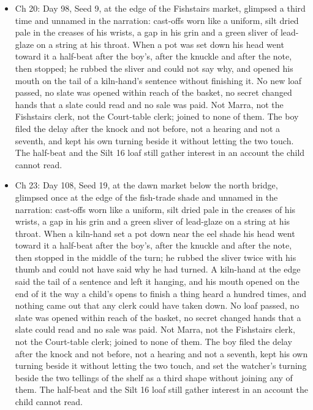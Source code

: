 \documentclass{design/chronicle}
\begin{document}
{\begin{itemize}[leftmargin=1.4em,itemsep=1pt,topsep=3pt,parsep=0pt]
\item Ch 20: Day 98, Seed 9, at the edge of the Fishstairs market, glimpsed a third time and unnamed in the narration: cast-offs worn like a uniform, silt dried pale in the creases of his wrists, a gap in his grin and a green sliver of lead-glaze on a string at his throat. When a pot was set down his head went toward it a half-beat after the boy’s, after the knuckle and after the note, then stopped; he rubbed the sliver and could not say why, and opened his mouth on the tail of a kiln-hand’s sentence without finishing it. No new loaf passed, no slate was opened within reach of the basket, no secret changed hands that a slate could read and no sale was paid. Not Marra, not the Fishstairs clerk, not the Court-table clerk; joined to none of them. The boy filed the delay after the knock and not before, not a hearing and not a seventh, and kept his own turning beside it without letting the two touch. The half-beat and the Silt 16 loaf still gather interest in an account the child cannot read.

\end{itemize}

\begin{itemize}[leftmargin=1.4em,itemsep=1pt,topsep=3pt,parsep=0pt]

\item Ch 23: Day 108, Seed 19, at the dawn market below the north bridge, glimpsed once at the edge of the fish-trade shade and unnamed in the narration: cast-offs worn like a uniform, silt dried pale in the creases of his wrists, a gap in his grin and a green sliver of lead-glaze on a string at his throat. When a kiln-hand set a pot down near the eel shade his head went toward it a half-beat after the boy’s, after the knuckle and after the note, then stopped in the middle of the turn; he rubbed the sliver twice with his thumb and could not have said why he had turned. A kiln-hand at the edge said the tail of a sentence and left it hanging, and his mouth opened on the end of it the way a child’s opens to finish a thing heard a hundred times, and nothing came out that any clerk could have taken down. No loaf passed, no slate was opened within reach of the basket, no secret changed hands that a slate could read and no sale was paid. Not Marra, not the Fishstairs clerk, not the Court-table clerk; joined to none of them. The boy filed the delay after the knock and not before, not a hearing and not a seventh, kept his own turning beside it without letting the two touch, and set the watcher’s turning beside the two tellings of the shelf as a third shape without joining any of them. The half-beat and the Silt 16 loaf still gather interest in an account the child cannot read.


\end{itemize}}
\end{document}
